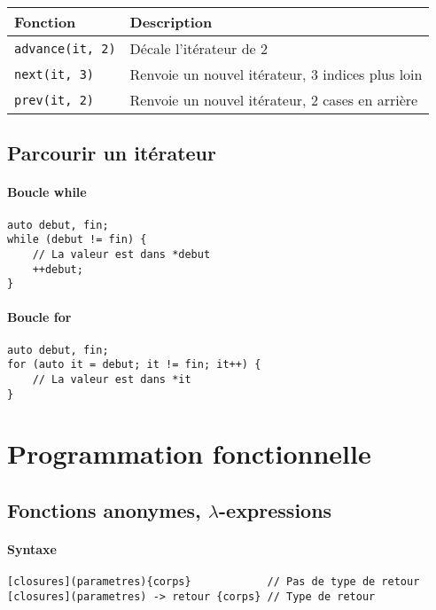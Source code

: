\documentclass[10pt,a4paper,french]{article}
\begin{document}
\begin{tabular}{l|l}
Fonction & Description \\
\hline
\texttt{advance(it, 2)} & Décale l'itérateur de 2 \\
\texttt{next(it, 3)} & Renvoie un nouvel itérateur, 3 indices plus loin \\
\texttt{prev(it, 2)} & Renvoie un nouvel itérateur, 2 cases en arrière \\
\end{tabular}

\subsection{Parcourir un itérateur}

\paragraph{Boucle while}
\begin{verbatim}
auto debut, fin;
while (debut != fin) {
    // La valeur est dans *debut
    ++debut;
}
\end{verbatim}

\paragraph{Boucle for}
\begin{verbatim}
auto debut, fin;
for (auto it = debut; it != fin; it++) {
    // La valeur est dans *it
}
\end{verbatim}

\section{Programmation fonctionnelle}\label{func-prog}

\subsection{Fonctions anonymes, $\lambda$-expressions}

\paragraph{Syntaxe}
\begin{verbatim}
[closures](parametres){corps}            // Pas de type de retour
[closures](parametres) -> retour {corps} // Type de retour
\end{verbatim}
\end{document}
